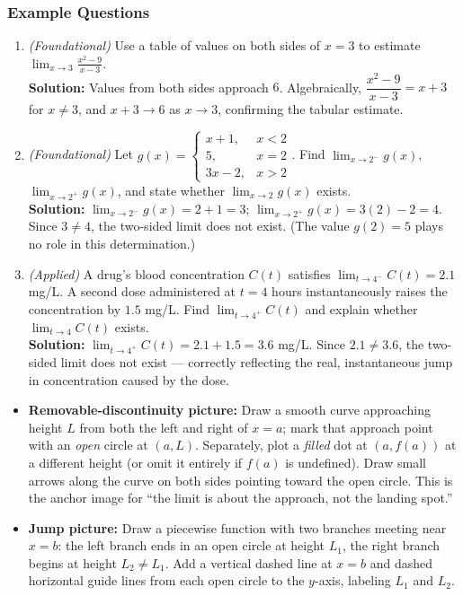 \documentclass[11pt]{article}
\begin{document}
\subsubsection*{Example Questions}
\begin{enumerate}[leftmargin=*]
  \item \textit{(Foundational)} Use a table of values on both sides of $x=3$ to estimate $\displaystyle\lim_{x\to 3}\frac{x^2-9}{x-3}$. \\
  \textbf{Solution:} Values from both sides approach $6$. Algebraically, $\dfrac{x^2-9}{x-3}=x+3$ for $x\ne 3$, and $x+3\to 6$ as $x\to 3$, confirming the tabular estimate.

  \item \textit{(Foundational)} Let $g(x) = \begin{cases} x+1, & x<2 \\ 5, & x=2 \\ 3x-2, & x>2 \end{cases}$. Find $\displaystyle\lim_{x\to 2^-}g(x)$, $\displaystyle\lim_{x\to 2^+}g(x)$, and state whether $\displaystyle\lim_{x\to 2}g(x)$ exists. \\
  \textbf{Solution:} $\displaystyle\lim_{x\to 2^-}g(x)=2+1=3$; $\displaystyle\lim_{x\to 2^+}g(x)=3(2)-2=4$. Since $3\ne 4$, the two-sided limit does not exist. (The value $g(2)=5$ plays no role in this determination.)

  \item \textit{(Applied)} A drug's blood concentration $C(t)$ satisfies $\displaystyle\lim_{t\to 4^-}C(t)=2.1$ mg/L. A second dose administered at $t=4$ hours instantaneously raises the concentration by $1.5$ mg/L. Find $\displaystyle\lim_{t\to 4^+}C(t)$ and explain whether $\displaystyle\lim_{t\to 4}C(t)$ exists. \\
  \textbf{Solution:} $\displaystyle\lim_{t\to 4^+}C(t)=2.1+1.5=3.6$ mg/L. Since $2.1 \ne 3.6$, the two-sided limit does not exist --- correctly reflecting the real, instantaneous jump in concentration caused by the dose.
\end{enumerate}

\begin{instructorbox}
\begin{itemize}[leftmargin=*]
  \item \textbf{Removable-discontinuity picture:} Draw a smooth curve approaching height $L$ from both the left and right of $x=a$; mark that approach point with an \emph{open} circle at $(a,L)$. Separately, plot a \emph{filled} dot at $(a, f(a))$ at a different height (or omit it entirely if $f(a)$ is undefined). Draw small arrows along the curve on both sides pointing toward the open circle. This is the anchor image for ``the limit is about the approach, not the landing spot.''
  \item \textbf{Jump picture:} Draw a piecewise function with two branches meeting near $x=b$: the left branch ends in an open circle at height $L_1$, the right branch begins at height $L_2 \ne L_1$. Add a vertical dashed line at $x=b$ and dashed horizontal guide lines from each open circle to the $y$-axis, labeling $L_1$ and $L_2$.
\end{itemize}
\end{instructorbox}
\end{document}
